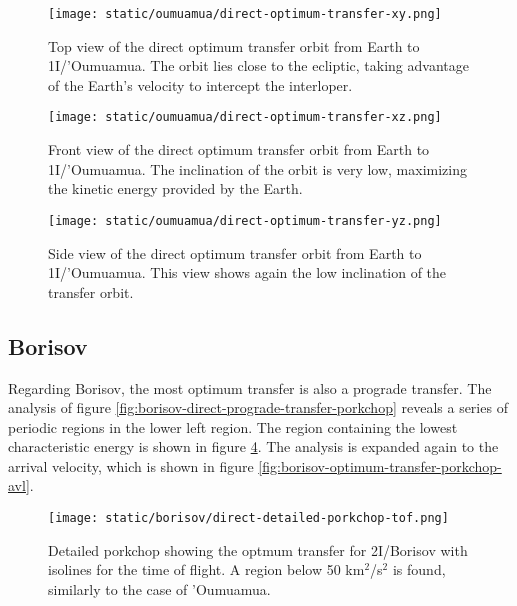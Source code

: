 \begin{figure}[H]
  \centering
  \texttt{[image: static/oumuamua/direct-optimum-transfer-xy.png]}
  \caption[Top view of the direct optimum transfer orbit from Earth to 1I/'Oumuamua]{
    Top view of the direct optimum transfer orbit from Earth to 1I/'Oumuamua.
    The orbit lies close to the ecliptic, taking advantage of the Earth's
    velocity to intercept the interloper.
  }
  \label{fig:optimum_oumuamua_orbit_xy}
\end{figure}

\begin{figure}[H]
  \centering
  \texttt{[image: static/oumuamua/direct-optimum-transfer-xz.png]}
  \caption[Front view of the direct optimum transfer orbit from Earth to 1I/'Oumuamua]{
    Front view of the direct optimum transfer orbit from Earth to 1I/'Oumuamua.
    The inclination of the orbit is very low, maximizing the kinetic energy
    provided by the Earth.
  }
  \label{fig:optimum_oumuamua_orbit_yz}
\end{figure}

\begin{figure}[H]
  \centering
  \texttt{[image: static/oumuamua/direct-optimum-transfer-yz.png]}
  \caption[Side view of the direct optimum transfer orbit from Earth to 1I/'Oumuamua]{
    Side view of the direct optimum transfer orbit from Earth to 1I/'Oumuamua.
    This view shows again the low inclination of the transfer orbit.}
  \label{fig:optimum_oumuamua_orbit_xz}
\end{figure}

\subsection{Borisov}

Regarding Borisov, the most optimum transfer is also a prograde transfer. The
analysis of figure \ref{fig:borisov-direct-prograde-transfer-porkchop} reveals a
series of periodic regions in the lower left region. The region containing the
lowest characteristic energy is shown in figure
\ref{fig:borisov-optimum-transfer-porkchop-tof}. The analysis is expanded again
to the arrival velocity, which is shown in figure
\ref{fig:borisov-optimum-transfer-porkchop-avl}.

\begin{figure}[H]
  \centering
  \texttt{[image: static/borisov/direct-detailed-porkchop-tof.png]}
        \caption[Detailed porkchop showing the optimum transfer for
        2I/Borisov with the time of flight.]{Detailed porkchop showing the
        optmum transfer for 2I/Borisov with isolines for the time of flight. A
        region below 50 km$^2$/s$^2$ is found, similarly to the case of
        'Oumuamua.}
  \label{fig:borisov-optimum-transfer-porkchop-tof}
\end{figure}

